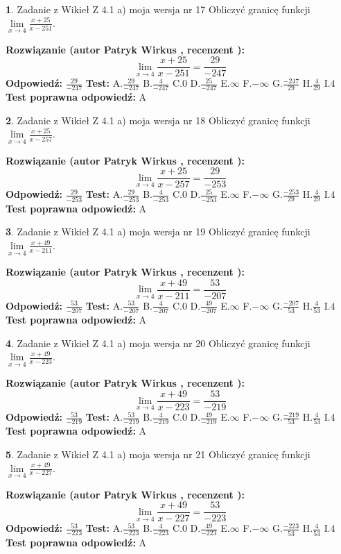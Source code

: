 \documentclass[12pt, a4paper]{article}
\theoremstyle{definition} %
\newtheorem{zad}{}
\newcommand{\zadStart}[1]{\begin{zad}#1\newline}
\newcommand{\zadStop}{\end{zad}}
\newcommand{\rozwStart}[2]{\noindent \textbf{Rozwiązanie (autor #1 , recenzent #2): }\newline}
\newcommand{\rozwStop}{\newline}
\newcommand{\odpStart}{\noindent \textbf{Odpowiedź:}\newline}
\newcommand{\odpStop}{\newline}
\newcommand{\testStart}{\noindent \textbf{Test:}\newline}
\newcommand{\testStop}{\newline}
\newcommand{\kluczStart}{\noindent \textbf{Test poprawna odpowiedź:}\newline}
\newcommand{\kluczStop}{\newline}
\begin{document}
\zadStart{Zadanie z Wikieł Z 4.1 a) moja wersja nr 17}
Obliczyć granicę funkcji $\lim\limits_{x\to4}\frac{x+25}{x-251}$.
\zadStop
\rozwStart{Patryk Wirkus}{}
$$\lim\limits_{x\to4}\frac{x+25}{x-251} = \frac{29}{-247}$$
\rozwStop
\odpStart
$\frac{29}{-247}$
\odpStop
\testStart
A.$\frac{29}{-247}$
B.$\frac{4}{-247}$
C.$0$
D.$\frac{25}{-247}$
E.$\infty$
F.$-\infty$
G.$\frac{-247}{29}$
H.$\frac{4}{29}$
I.$4$
\testStop
\kluczStart
A
\kluczStop



\zadStart{Zadanie z Wikieł Z 4.1 a) moja wersja nr 18}
Obliczyć granicę funkcji $\lim\limits_{x\to4}\frac{x+25}{x-257}$.
\zadStop
\rozwStart{Patryk Wirkus}{}
$$\lim\limits_{x\to4}\frac{x+25}{x-257} = \frac{29}{-253}$$
\rozwStop
\odpStart
$\frac{29}{-253}$
\odpStop
\testStart
A.$\frac{29}{-253}$
B.$\frac{4}{-253}$
C.$0$
D.$\frac{25}{-253}$
E.$\infty$
F.$-\infty$
G.$\frac{-253}{29}$
H.$\frac{4}{29}$
I.$4$
\testStop
\kluczStart
A
\kluczStop



\zadStart{Zadanie z Wikieł Z 4.1 a) moja wersja nr 19}
Obliczyć granicę funkcji $\lim\limits_{x\to4}\frac{x+49}{x-211}$.
\zadStop
\rozwStart{Patryk Wirkus}{}
$$\lim\limits_{x\to4}\frac{x+49}{x-211} = \frac{53}{-207}$$
\rozwStop
\odpStart
$\frac{53}{-207}$
\odpStop
\testStart
A.$\frac{53}{-207}$
B.$\frac{4}{-207}$
C.$0$
D.$\frac{49}{-207}$
E.$\infty$
F.$-\infty$
G.$\frac{-207}{53}$
H.$\frac{4}{53}$
I.$4$
\testStop
\kluczStart
A
\kluczStop



\zadStart{Zadanie z Wikieł Z 4.1 a) moja wersja nr 20}
Obliczyć granicę funkcji $\lim\limits_{x\to4}\frac{x+49}{x-223}$.
\zadStop
\rozwStart{Patryk Wirkus}{}
$$\lim\limits_{x\to4}\frac{x+49}{x-223} = \frac{53}{-219}$$
\rozwStop
\odpStart
$\frac{53}{-219}$
\odpStop
\testStart
A.$\frac{53}{-219}$
B.$\frac{4}{-219}$
C.$0$
D.$\frac{49}{-219}$
E.$\infty$
F.$-\infty$
G.$\frac{-219}{53}$
H.$\frac{4}{53}$
I.$4$
\testStop
\kluczStart
A
\kluczStop



\zadStart{Zadanie z Wikieł Z 4.1 a) moja wersja nr 21}
Obliczyć granicę funkcji $\lim\limits_{x\to4}\frac{x+49}{x-227}$.
\zadStop
\rozwStart{Patryk Wirkus}{}
$$\lim\limits_{x\to4}\frac{x+49}{x-227} = \frac{53}{-223}$$
\rozwStop
\odpStart
$\frac{53}{-223}$
\odpStop
\testStart
A.$\frac{53}{-223}$
B.$\frac{4}{-223}$
C.$0$
D.$\frac{49}{-223}$
E.$\infty$
F.$-\infty$
G.$\frac{-223}{53}$
H.$\frac{4}{53}$
I.$4$
\testStop
\kluczStart
A
\kluczStop
\end{document}
